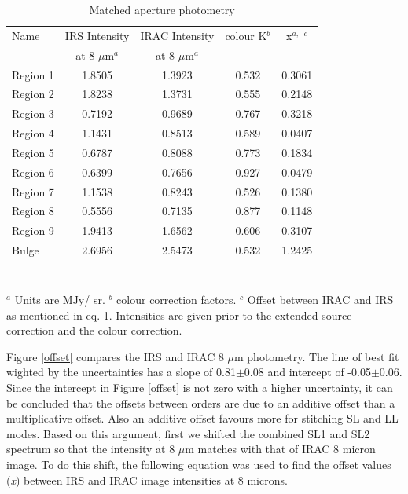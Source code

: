 \begin{table}
 \centering
 \begin{minipage}{90mm}
\caption{Matched aperture photometry}
  \begin{tabular}{lcccc}
  \hline{Name}&{IRS Intensity}&{IRAC Intensity}&{colour K$^b$}&{x$^{a,}$ $^c$} \\ {}&{at 8 $\mu$m$^a$}&{at 8 $\mu$m$^a$}&{}&{} 
   \\
 \hline

 Region 1 & 1.8505 & 1.3923 & 0.532 & 0.3061
 \\ Region 2  & 1.8238 & 1.3731 & 0.555 & 0.2148
 \\ Region 3 & 0.7192 & 0.9689 & 0.767 & 0.3218
 \\ Region 4 & 1.1431 & 0.8513 & 0.589 & 0.0407
 \\  Region 5 & 0.6787 & 0.8088 & 0.773 & 0.1834
 \\  Region 6  & 0.6399 & 0.7656 & 0.927 & 0.0479
 \\  Region 7  & 1.1538 & 0.8243 & 0.526 & 0.1380
 \\ Region 8 & 0.5556 & 0.7135 & 0.877 & 0.1148
 \\  Region 9 & 1.9413 & 1.6562 & 0.606 & 0.3107 
 \\ Bulge & 2.6956 & 2.5473 & 0.532 & 1.2425\\

\hline
 \label{colourK}

\end{tabular}\\
 {$^a$ Units are MJy/ sr. $^b$ colour correction factors. $^c$ Offset between IRAC and IRS as mentioned in eq. 1. Intensities are given prior to the extended source correction and the colour correction.}
\end{minipage}
\end{table}


Figure \ref{offset} compares the IRS and IRAC 8 $\mu$m photometry. The line of best fit wighted by the uncertainties has a slope of 0.81$\pm$0.08 and intercept of -0.05$\pm$0.06.  Since the intercept in Figure \ref{offset} is not zero with a higher uncertainty, it can be concluded that the offsets between orders are due to an additive offset than a multiplicative offset. Also an additive offset favours more for stitching SL and LL modes. Based on this argument, first we shifted the combined SL1 and SL2 spectrum so that the intensity at 8 $\mu$m matches with that of IRAC 8 micron image. To do this shift, the following equation was used to find the offset values (\emph{x}) between IRS and IRAC image intensities at 8 microns. 
	
